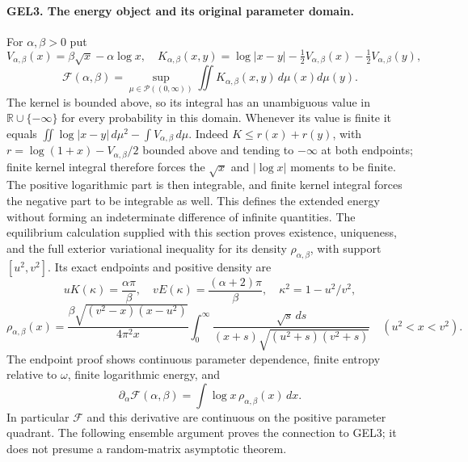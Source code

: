 \paragraph{GEL3. The energy object and its original parameter domain.}
For \(\alpha,\beta>0\) put
\[
 V_{\alpha,\beta}(x)=\beta\sqrt x-\alpha\log x,
 \quad K_{\alpha,\beta}(x,y)=\log|x-y|
           -\tfrac12V_{\alpha,\beta}(x)-\tfrac12V_{\alpha,\beta}(y),
\]
\[
 \mathcal F(\alpha,\beta)=\sup_{\mu\in\mathcal P((0,\infty))}
                   \iint K_{\alpha,\beta}(x,y)\,d\mu(x)d\mu(y).
 \tag{GEL7}
\]
The kernel is bounded above, so its integral has an unambiguous value
in \(\mathbb R\cup\{-\infty\}\) for every probability in this domain.
Whenever its value is finite it equals
\(\iint\log|x-y|\,d\mu^2-\int V_{\alpha,\beta}\,d\mu\).
Indeed \(K\leq r(x)+r(y)\), with
\(r=\log(1+x)-V_{\alpha,\beta}/2\) bounded above and tending to
\(-\infty\) at both endpoints; finite kernel integral therefore forces
the \(\sqrt x\) and \(|\log x|\) moments to be finite. The positive
logarithmic part is then integrable, and finite kernel integral forces
the negative part to be integrable as well. This defines the extended
energy without forming an indeterminate difference of infinite quantities.
The equilibrium calculation supplied with this section proves existence,
uniqueness, and the full exterior variational inequality for its density
\(\rho_{\alpha,\beta}\), with support \([u^2,v^2]\). Its exact endpoints
and positive density are
\[
 uK(\kappa)=\frac{\alpha\pi}{\beta},\quad
 vE(\kappa)=\frac{(\alpha+2)\pi}{\beta},\quad
 \kappa^2=1-u^2/v^2,
\]
\[
 \rho_{\alpha,\beta}(x)=
 \frac{\beta\sqrt{(v^2-x)(x-u^2)}}{4\pi^2x}
 \int_0^\infty
 \frac{\sqrt s\,ds}{(x+s)\sqrt{(u^2+s)(v^2+s)}}
       \quad(u^2<x<v^2).
 \tag{GEL8}
\]
The endpoint proof shows continuous parameter dependence, finite entropy
relative to \(\omega\), finite logarithmic energy, and
\[
 \partial_\alpha\mathcal F(\alpha,\beta)
       =\int\log x\,\rho_{\alpha,\beta}(x)\,dx.
 \tag{GEL9}
\]
In particular \(\mathcal F\) and this derivative are continuous on the
positive parameter quadrant. The following ensemble argument proves the
connection to GEL3; it does not presume a random-matrix asymptotic theorem.

